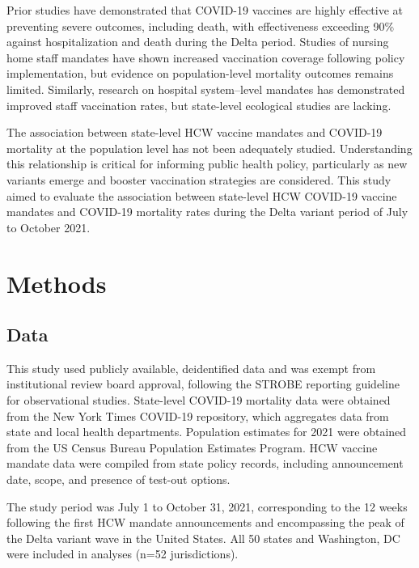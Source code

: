 \documentclass[10pt, letterpaper]{article}
\begin{document}
Prior studies have demonstrated that COVID-19 vaccines are highly effective at preventing severe outcomes, including death, with effectiveness exceeding 90\% against hospitalization and death during the Delta period.\cite{CDC2021,Thompson2021} Studies of nursing home staff mandates have shown increased vaccination coverage following policy implementation, but evidence on population-level mortality outcomes remains limited.\cite{Chen2022} Similarly, research on hospital system--level mandates has demonstrated improved staff vaccination rates, but state-level ecological studies are lacking.\cite{Karlsson2022}

The association between state-level HCW vaccine mandates and COVID-19 mortality at the population level has not been adequately studied. Understanding this relationship is critical for informing public health policy, particularly as new variants emerge and booster vaccination strategies are considered. This study aimed to evaluate the association between state-level HCW COVID-19 vaccine mandates and COVID-19 mortality rates during the Delta variant period of July to October 2021.


\section*{Methods}

\subsection*{Data}
This study used publicly available, deidentified data and was exempt from institutional review board approval, following the STROBE reporting guideline for observational studies.\cite{STROBE2007} State-level COVID-19 mortality data were obtained from the New York Times COVID-19 repository, which aggregates data from state and local health departments.\cite{NYTimes2020} Population estimates for 2021 were obtained from the US Census Bureau Population Estimates Program.\cite{Census2024} HCW vaccine mandate data were compiled from state policy records, including announcement date, scope, and presence of test-out options.

The study period was July 1 to October 31, 2021, corresponding to the 12 weeks following the first HCW mandate announcements and encompassing the peak of the Delta variant wave in the United States. All 50 states and Washington, DC were included in analyses (n=52 jurisdictions).
\end{document}
